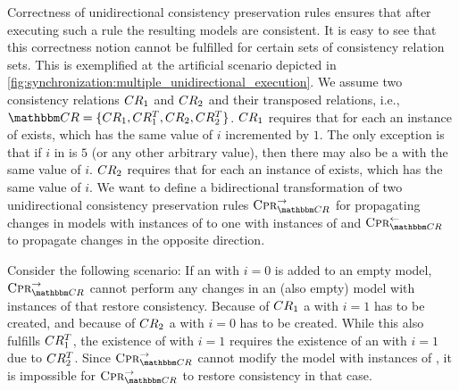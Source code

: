Correctness of unidirectional consistency preservation rules ensures that after executing such a rule the resulting models are consistent.
It is easy to see that this correctness notion cannot be fulfilled for certain sets of consistency relation sets.
This is exemplified at the artificial scenario depicted in \autoref{fig:synchronization:multiple_unidirectional_execution}.
We assume two consistency relations $CR_{1}$ and $CR_{2}$ and their transposed relations, i.e., $\consistencyrelationset{CR} = \setted{\consistencyrelation{CR}{1}, \consistencyrelation{CR}{1}^T, \consistencyrelation{CR}{2}, \consistencyrelation{CR}{2}^T}$.
$CR_{1}$ requires that for each  an instance of  exists, which has the same value of $i$ incremented by $1$.
The only exception is that if $i$ in  is $5$ (or any other arbitrary value), then there may also be a  with the same value of $i$.
$CR_{2}$ requires that for each  an instance of  exists, which has the same value of $i$.
We want to define a bidirectional transformation of two unidirectional consistency preservation rules $\consistencypreservationrule{\consistencyrelationset{CR}}^{\rightarrow}$ for propagating changes in models with instances of  to one with instances of  and $\consistencypreservationrule{\consistencyrelationset{CR}}^{\leftarrow}$ to propagate changes in the opposite direction. 

Consider the following scenario: If an  with $i = 0$ is added to an empty model, $\consistencypreservationrule{\consistencyrelationset{CR}}^{\rightarrow}$ cannot perform any changes in an (also empty) model with instances of  that restore consistency.
Because of $CR_{1}$ a  with $i = 1$ has to be created, and because of $CR_{2}$ a  with $i = 0$ has to be created.
While this also fulfills $CR_{1}^T$, the existence of  with $i = 1$ requires the existence of an  with $i = 1$ due to $CR_{2}^T$.
Since $\consistencypreservationrule{\consistencyrelationset{CR}}^{\rightarrow}$ cannot modify the model with instances of , it is impossible for $\consistencypreservationrule{\consistencyrelationset{CR}}^{\rightarrow}$ to restore consistency in that case.

